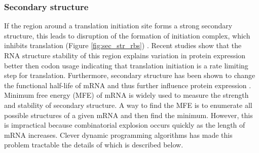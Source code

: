\subsubsection{Secondary structure}
If the region around a translation initiation site forms a strong secondary structure, this leads to disruption of the formation of initiation complex, which inhibits translation (Figure \ref{fig:sec_str_rbs}) \cite{Kudla2009-tl, Espah_Borujeni2014-vy, Tuller2015-ts}. Recent studies show that the RNA structure stability of this region explains variation in protein expression better then codon usage \cite{Kudla2009-tl, Plotkin2011-ak, Cambray2018-kn} indicating that translation initiation is a rate limiting step for translation. Furthermore, secondary structure has been shown to change the functional half-life of mRNA and thus further influence protein expression \cite{mauger2019mrna}. Minimum free energy (MFE) of mRNA is widely used to measure the strength and stability of secondary structure. A way to find the MFE is to enumerate all possible structures of a given mRNA and then find the minimum. However, this is impractical because combinatorial explosion occurs quickly as the length of mRNA increases. Clever dynamic programming algorithms has made this problem tractable the details of which is described below.


